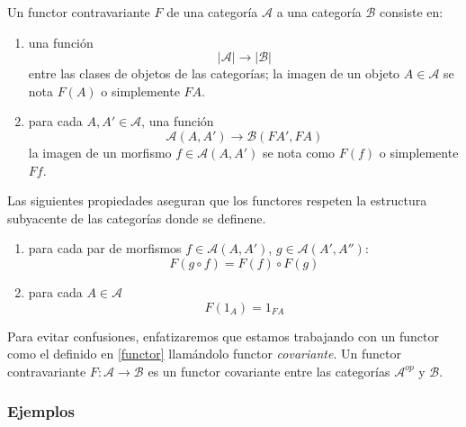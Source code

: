 \begin{definicion} 
    Un functor contravariante $F$ de una categoría $\mathscr{A}$ a una categoría $\mathscr{B}$ consiste en:

    \begin{enumerate}
        \item una función \begin{equation}|\mathscr{A}| \longrightarrow |\mathscr{B}| \end{equation} entre las clases de objetos de las categorías; la imagen de un objeto $A \in \mathscr{A}$ se nota $F(A)$ o simplemente $FA$.

        \item para cada $A, A' \in \mathscr{A}$, una función \begin{equation}\mathscr{A}(A,A') \longrightarrow \mathscr{B}(FA',FA) \end{equation}
        la imagen de un morfismo $f \in \mathscr{A}(A,A')$ se nota como $F(f)$ o simplemente $Ff$.
    \end{enumerate}

Las siguientes propiedades aseguran que los functores respeten la estructura subyacente de las categorías donde se definene.
  \begin{enumerate}
        \item para cada par de morfismos $f \in \mathscr{A}(A,A')$, $g \in          \mathscr{A}(A',A''): $ \begin{equation} F(g \circ f) = F(f) \circ F(g)   \end{equation}

        \item para cada $A \in \mathscr{A}$ \begin{equation}
            F(1_{A}) = 1_{FA}
        \end{equation}
    \end{enumerate}  
\end{definicion}

Para evitar confusiones, enfatizaremos que estamos trabajando con un functor como el definido en \ref{functor} llamándolo functor \emph{covariante}. Un functor contravariante $F: \mathscr{A} \longrightarrow \mathscr{B}$ es un functor covariante entre las categorías $\mathscr{A}^{op}$ y $\mathscr{B}$.

\subsubsection{Ejemplos}

